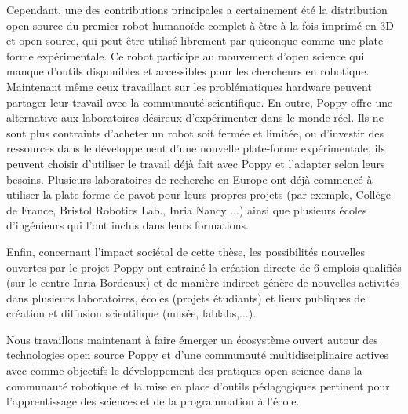 Cependant, une des contributions principales a certainement été la distribution open source du premier robot humanoïde complet à être à la fois imprimé en 3D et open source, qui peut être utilisé librement par quiconque comme une plate-forme expérimentale. 
Ce robot participe au mouvement d'open science qui manque d'outils disponibles et accessibles pour les chercheurs en robotique.  Maintenant même ceux travaillant sur les problématiques hardware peuvent partager leur travail avec la communauté scientifique. En outre, Poppy offre une alternative aux laboratoires désireux d'expérimenter dans le monde réel. Ils ne sont plus contraints d'acheter un robot soit fermée et limitée, ou d'investir des ressources dans le développement d'une nouvelle plate-forme expérimentale, ils peuvent choisir d'utiliser le travail déjà fait avec Poppy et l'adapter selon leurs besoins.
Plusieurs laboratoires de recherche en Europe ont déjà commencé à utiliser la plate-forme de pavot pour leurs propres projets (par exemple, Collège de France, Bristol Robotics Lab., Inria Nancy ...) ainsi que plusieurs écoles d'ingénieurs qui l'ont inclus dans leurs formations.

Enfin, concernant l'impact sociétal de cette thèse, les possibilités nouvelles ouvertes par le projet Poppy ont entrainé la création directe de 6 emplois qualifiés (sur le centre Inria Bordeaux) et de manière indirect génère de nouvelles activités dans plusieurs laboratoires, écoles (projets étudiants) et lieux publiques de création et diffusion scientifique (musée, fablabs,...).

Nous travaillons maintenant à faire émerger un écosystème ouvert autour des technologies open source Poppy et d'une communauté multidisciplinaire actives avec comme objectifs le développement des pratiques open science dans la communauté robotique et la mise en place d'outils pédagogiques pertinent pour l'apprentissage des sciences et de la programmation à l'école.






